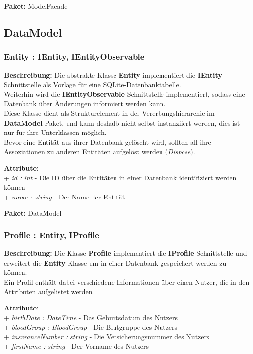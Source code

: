 \documentclass[a4paper]{scrreprt}
\begin{document}
\textbf{Paket:} ModelFacade

\subsection{DataModel}

\subsubsection{Entity : IEntity, IEntityObservable}
\textbf{Beschreibung:} Die abstrakte Klasse \textbf{Entity} implementiert die \textbf{IEntity} Schnittstelle als Vorlage für eine SQLite-Datenbanktabelle.\\
Weiterhin wird die \textbf{IEntityObservable} Schnittstelle implementiert, sodass eine Datenbank über Änderungen informiert werden kann.\\
Diese Klasse dient als Strukturelement in der Vererbungshierarchie im \textbf{DataModel} Paket, und kann deshalb nicht selbst instanziiert werden, dies ist nur für ihre Unterklassen möglich.\\
Bevor eine Entität aus ihrer Datenbank gelöscht wird, sollten all ihre Assoziationen zu anderen Entitäten aufgelöst werden (\textit{Dispose}).

\textbf{Attribute:}\\
+ \textit{id : int} - Die ID über die Entitäten in einer Datenbank identifiziert werden können\\
+ \textit{name : string} - Der Name der Entität

\textbf{Paket:} DataModel

\subsubsection{Profile : Entity, IProfile}
\textbf{Beschreibung:} Die Klasse \textbf{Profile} implementiert die \textbf{IProfile} Schnittstelle und erweitert die \textbf{Entity} Klasse um in einer Datenbank gespeichert werden zu können.\\
Ein Profil enthält dabei verschiedene Informationen über einen Nutzer, die in den Attributen aufgelistet werden.

\textbf{Attribute:}\\
+ \textit{birthDate : DateTime} - Das Geburtsdatum des Nutzers\\
+ \textit{bloodGroup : BloodGroup} - Die Blutgruppe des Nutzers\\
+ \textit{insuranceNumber : string} - Die Versicherungsnummer des Nutzers\\
+ \textit{firstName : string} - Der Vorname des Nutzers
\end{document}

